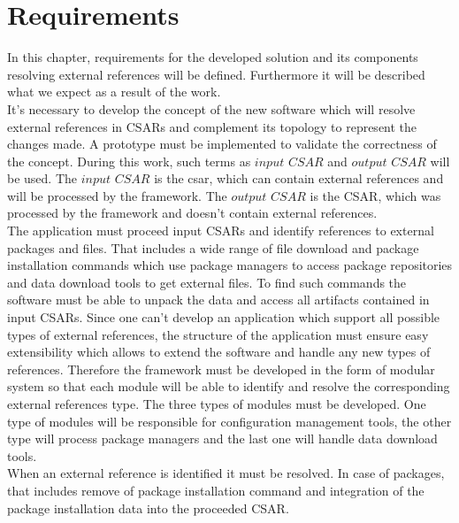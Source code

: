 
\chapter{Requirements}\label{chap:req}
In this chapter, requirements for the developed solution and its components resolving external references will be defined.
Furthermore it will be described what we expect as a result of the work.\\
It's necessary to develop the concept of the new software which will resolve external references in CSARs and complement its topology to represent the changes made.
A prototype must be implemented to validate the correctness of the concept.
During this work, such terms as $input$ $CSAR$ and $output$ $CSAR$ will be used.
The $input$ $CSAR$ is the \gls{csar}, which can contain external references and will be processed by the framework. %
The $output$ $CSAR$ is the CSAR, which was processed by the framework and doesn't contain external references. \\%
The application must proceed input CSARs and identify references to external packages and files.
That includes a wide range of file download and package installation commands which use package managers to access package repositories and data download tools to get external files.
To find such commands the software must be able to unpack the data and access all artifacts contained in input CSARs.
Since one can't develop an application which support all possible types of external references, the structure of the application must ensure easy extensibility which allows to extend the software and handle any new types of references.
Therefore the framework must be developed in the form of modular system so that each module will be able to identify and resolve the corresponding external references type.
The three types of modules must be developed.
One type of modules will be responsible for configuration management tools, the other type will process package managers and the last one will handle data download tools.\\
When an external reference is identified it must be resolved. 
In case of packages, that includes remove of package installation command and integration of the package installation data into the proceeded CSAR.
